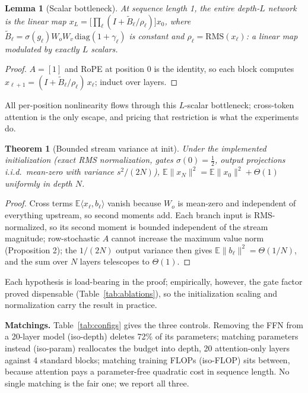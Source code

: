 \documentclass[letterpaper]{article} %
\newtheorem{lemma}{Lemma}
\newtheorem{theorem}{Theorem}
\begin{document}
\begin{lemma}[Scalar bottleneck]
At sequence length 1, the entire depth-$L$ network is the linear map
$x_L = \big[\prod_\ell (I + \tilde B_\ell/\rho_\ell)\big]x_0$, where
$\tilde B_\ell = \sigma(g_\ell) W_o W_v\,\mathrm{diag}(1+\gamma_\ell)$ is
constant and $\rho_\ell = \mathrm{RMS}(x_\ell)$: a linear map modulated by
exactly $L$ scalars.
\end{lemma}
\begin{proof}
$A = [1]$ and RoPE at position 0 is the identity, so each block computes
$x_{\ell+1} = (I + \tilde B_\ell/\rho_\ell)\,x_\ell$; induct over layers.
\end{proof}

\noindent All per-position nonlinearity flows through this $L$-scalar
bottleneck; cross-token attention is the only escape, and pricing that
restriction is what the experiments do.

\begin{theorem}[Bounded stream variance at init]
Under the implemented initialization (exact RMS normalization, gates
$\sigma(0)=\tfrac12$, output projections i.i.d.\ mean-zero with variance
$s^2/(2N)$), $\mathbb{E}\|x_N\|^2 = \mathbb{E}\|x_0\|^2 + \Theta(1)$
uniformly in depth $N$.
\end{theorem}
\begin{proof}
Cross terms $\mathbb{E}\langle x_\ell, b_\ell\rangle$ vanish because
$W_o$ is mean-zero and independent of everything upstream, so second
moments add. Each branch input is RMS-normalized, so its second moment is
bounded independent of the stream magnitude; row-stochastic $A$ cannot
increase the maximum value norm (Proposition 2); the $1/(2N)$ output
variance then gives $\mathbb{E}\|b_\ell\|^2 = \Theta(1/N)$, and the sum
over $N$ layers telescopes to $\Theta(1)$.
\end{proof}

\noindent Each hypothesis is load-bearing in the proof; empirically,
however, the gate factor proved dispensable (Table~\ref{tab:ablations}),
so the initialization scaling and normalization carry the result in
practice.

\textbf{Matchings.} Table~\ref{tab:configs} gives the three controls.
Removing the FFN from a 20-layer model (iso-depth) deletes 72\% of its
parameters; matching parameters instead (iso-param) reallocates the budget
into depth, 20 attention-only layers against 4 standard blocks; matching
training FLOPs (iso-FLOP) sits between, because attention pays a
parameter-free quadratic cost in sequence length. No single matching is
the fair one; we report all three.
\end{document}

